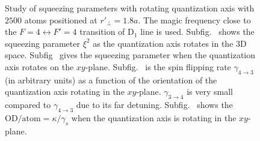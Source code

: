 \documentclass[preprint,aps,pra,onecolumn]{revtex4-1} %
\begin{document}
\begin{figure}
\caption{Study of squeezing parameters with rotating quantization axis with $2500$ atoms positioned at $ r'\!_\perp=1.8a $. The magic frequency close to the $ F=4 \leftrightarrow F'=4$ transition of $ \mathrm{D}_1 $ line is used. Subfig.~\protect{} shows the squeezing parameter $ \xi^2 $ as the quantization axis rotates in the 3D space. Subfig~\protect{} gives the squeezing parameter when the quantization axis rotates on the $ xy $-plane. Subfig.~\protect{} is the spin flipping rate $ \gamma_{4\rightarrow 3} $ (in arbitrary units) as a function of the orientation of the quantization axis rotating in the $ xy $-plane. $ \gamma_{3\rightarrow 4} $ is very small compared to $ \gamma_{4\rightarrow 3} $ due to its far detuning. Subfig.~\protect{} shows the $ \mathrm{OD}/{\mathrm{atom}}=\kappa/\gamma_s $ when the quantization axis is rotating in the $ xy $-plane.  }\label{fig:squeezing_q_D1_NA2500_r1d8a}
\end{figure}
\end{document}
